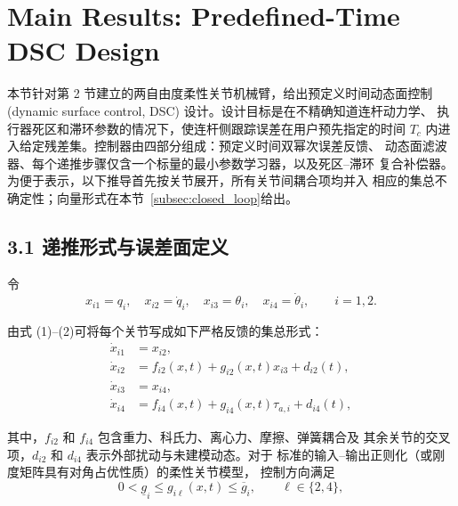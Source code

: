 \documentclass{article}
\begin{document}
\section{Main Results: Predefined-Time DSC Design}
\label{sec:main_results}

本节针对第 2 节建立的两自由度柔性关节机械臂，给出预定义时间动态面控制
(dynamic surface control, DSC) 设计。设计目标是在不精确知道连杆动力学、
执行器死区和滞环参数的情况下，使连杆侧跟踪误差在用户预先指定的时间
$T_c$ 内进入给定残差集。控制器由四部分组成：预定义时间双幂次误差反馈、
动态面滤波器、每个递推步骤仅含一个标量的最小参数学习器，以及死区--滞环
复合补偿器。为便于表示，以下推导首先按关节展开，所有关节间耦合项均并入
相应的集总不确定性；向量形式在本节~\ref{subsec:closed_loop}给出。

\subsection{3.1 递推形式与误差面定义}
\label{subsec:recursive_form}

令
\begin{equation}
 x_{i1}=q_i,\quad x_{i2}=\dot q_i,\quad
 x_{i3}=\theta_i,\quad x_{i4}=\dot\theta_i,\qquad i=1,2 .

 \tag{35}
\label{eq:component_states}
\end{equation}

由式 (1)--(2)可将每个关节写成如下严格反馈的集总形式：
\begin{equation}
\begin{aligned}
 \dot x_{i1}&=x_{i2},\\
 \dot x_{i2}&=f_{i2}(x,t)+g_{i2}(x,t)x_{i3}+d_{i2}(t),\\
 \dot x_{i3}&=x_{i4},\\
 \dot x_{i4}&=f_{i4}(x,t)+g_{i4}(x,t)\tau_{a,i}+d_{i4}(t),
\end{aligned}

 \tag{36}
\label{eq:strict_feedback}
\end{equation}

其中，$f_{i2}$ 和 $f_{i4}$ 包含重力、科氏力、离心力、摩擦、弹簧耦合及
其余关节的交叉项，$d_{i2}$ 和 $d_{i4}$ 表示外部扰动与未建模动态。对于
标准的输入--输出正则化（或刚度矩阵具有对角占优性质）的柔性关节模型，
控制方向满足
\begin{equation}
 0<\underline g_i\leq g_{i\ell}(x,t)\leq\overline g_i,
 \qquad \ell\in\{2,4\},

 \tag{37}
\label{eq:gain_bounds}
\end{equation}
\end{document}

